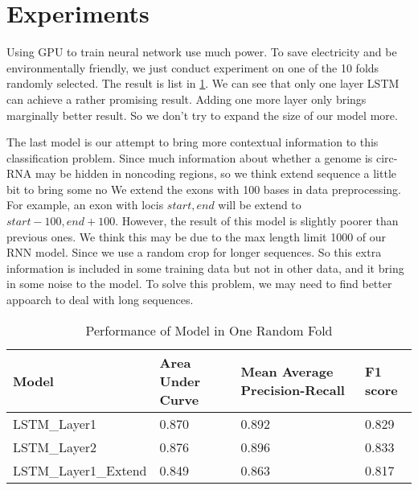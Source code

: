 \documentclass[paper=a4, fontsize=11pt] {scrartcl} %
\numberwithin{equation}{section} %
\numberwithin{figure}{section} %
\numberwithin{table}{section} %
\begin{document}
\section{Experiments}

Using GPU to train neural network use much power. To save electricity and be environmentally friendly, we just conduct experiment on one of the 10 folds randomly selected. The result is list in \ref{results}. We can see that only one layer LSTM can achieve a rather promising result. Adding one more layer only brings marginally better result. So we don't try to expand the size of our model more. 

The last model is our attempt to bring more contextual information to this classification problem. Since much information about whether a genome is circ-RNA may be hidden in noncoding regions, so we think extend sequence a little bit to bring some no  We extend the exons with 100 bases in data preprocessing. For example, an exon with locis $start,end$ will be extend to $start-100,end+100$. However, the result of this model is slightly poorer than previous ones. We think this may be due to the max length limit 1000 of our RNN model. Since we use a random crop for longer sequences. So this extra information is included in some training data but not in other data, and it bring in some noise to the model. To solve this problem, we may need to find better appoarch to deal with long sequences.
\begin{table}[]
\centering
\caption{Performance of Model in One Random Fold}
\label{results}
\begin{tabular}{llll}
\hline
Model & Area Under Curve & Mean Average Precision-Recall & F1 score \\ \hline
LSTM\_Layer1 & 0.870            & 0.892                         & 0.829    \\
LSTM\_Layer2 & 0.876 & 0.896 & 0.833  \\  
LSTM\_Layer1\_Extend & 0.849 &  0.863 & 0.817 \\ \hline
\end{tabular}
\end{table}


\end{document}
